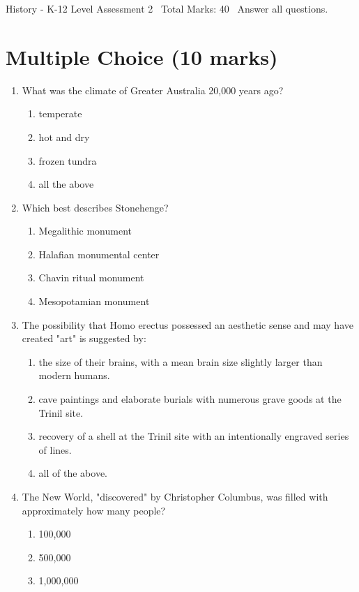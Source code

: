\documentclass[12pt]{article}
\begin{document}
\begin{center}
History - K-12 Level Assessment 2 \
Total Marks: 40 \
Answer all questions.
\end{center}

\section*{Multiple Choice (10 marks)}
\begin{enumerate}[label=\arabic*.]
\item What was the climate of Greater Australia 20,000 years ago?
\begin{enumerate}[label=(\alph*)]
    \item temperate
    \item hot and dry
    \item frozen tundra
    \item all the above
\end{enumerate}
\item Which best describes Stonehenge?
\begin{enumerate}[label=(\alph*)]
    \item Megalithic monument
    \item Halafian monumental center
    \item Chavin ritual monument
    \item Mesopotamian monument
\end{enumerate}
\item The possibility that Homo erectus possessed an aesthetic sense and may have created "art"
is suggested by:
\begin{enumerate}[label=(\alph*)]
    \item the size of their brains, with a mean brain size slightly larger than modern humans.
    \item cave paintings and elaborate burials with numerous grave goods at the Trinil site.
    \item recovery of a shell at the Trinil site with an intentionally engraved series of lines.
    \item all of the above.
\end{enumerate}
\item The New World, "discovered" by Christopher Columbus, was filled with approximately how
many people?
\begin{enumerate}[label=(\alph*)]
    \item 100,000
    \item 500,000
    \item 1,000,000

\end{enumerate}
\end{enumerate}
\end{document}
